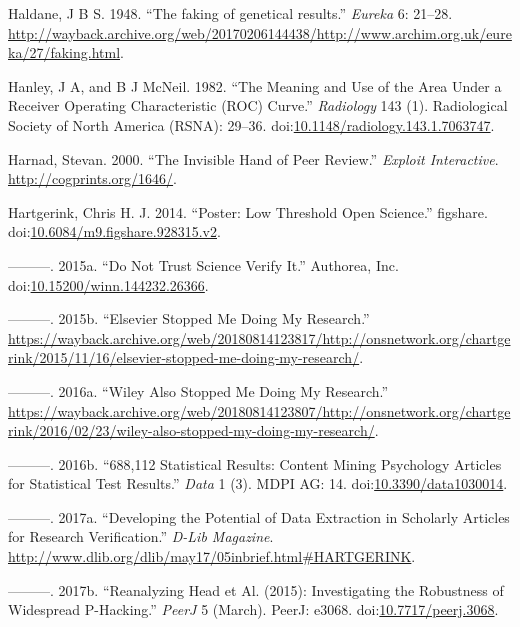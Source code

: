 \documentclass[a5paper]{book}
\begin{document}
\hypertarget{ref-Haldane1948-nm}{}
Haldane, J B S. 1948. ``The faking of genetical results.'' \emph{Eureka}
6: 21--28.
\url{http://wayback.archive.org/web/20170206144438/http://www.archim.org.uk/eureka/27/faking.html}.

\hypertarget{ref-doi:10.1148ux2fradiology.143.1.7063747}{}
Hanley, J A, and B J McNeil. 1982. ``The Meaning and Use of the Area
Under a Receiver Operating Characteristic (ROC) Curve.''
\emph{Radiology} 143 (1). Radiological Society of North America (RSNA):
29--36.
doi:\href{https://doi.org/10.1148/radiology.143.1.7063747}{10.1148/radiology.143.1.7063747}.

\hypertarget{ref-cogprints1646}{}
Harnad, Stevan. 2000. ``The Invisible Hand of Peer Review.''
\emph{Exploit Interactive}. \url{http://cogprints.org/1646/}.

\hypertarget{ref-doi:10.6084ux2fm9.figshare.928315.v2}{}
Hartgerink, Chris H. J. 2014. ``Poster: Low Threshold Open Science.''
figshare.
doi:\href{https://doi.org/10.6084/m9.figshare.928315.v2}{10.6084/m9.figshare.928315.v2}.

\hypertarget{ref-doi:10.15200ux2fwinn.144232.26366}{}
---------. 2015a. ``Do Not Trust Science Verify It.'' Authorea, Inc.
doi:\href{https://doi.org/10.15200/winn.144232.26366}{10.15200/winn.144232.26366}.

\hypertarget{ref-ons-elsevier}{}
---------. 2015b. ``Elsevier Stopped Me Doing My Research.''
\url{https://wayback.archive.org/web/20180814123817/http://onsnetwork.org/chartgerink/2015/11/16/elsevier-stopped-me-doing-my-research/}.

\hypertarget{ref-ons-wiley}{}
---------. 2016a. ``Wiley Also Stopped Me Doing My Research.''
\url{https://wayback.archive.org/web/20180814123807/http://onsnetwork.org/chartgerink/2016/02/23/wiley-also-stopped-my-doing-my-research/}.

\hypertarget{ref-doi:10.3390ux2fdata1030014}{}
---------. 2016b. ``688,112 Statistical Results: Content Mining
Psychology Articles for Statistical Test Results.'' \emph{Data} 1 (3).
MDPI AG: 14.
doi:\href{https://doi.org/10.3390/data1030014}{10.3390/data1030014}.

\hypertarget{ref-Hartgerink-dlib2017}{}
---------. 2017a. ``Developing the Potential of Data Extraction in
Scholarly Articles for Research Verification.'' \emph{D-Lib Magazine}.
\url{http://www.dlib.org/dlib/may17/05inbrief.html\#HARTGERINK}.

\hypertarget{ref-doi:10.7717ux2fpeerj.3068}{}
---------. 2017b. ``Reanalyzing Head et Al. (2015): Investigating the
Robustness of Widespread P-Hacking.'' \emph{PeerJ} 5 (March). PeerJ:
e3068.
doi:\href{https://doi.org/10.7717/peerj.3068}{10.7717/peerj.3068}.
\end{document}
